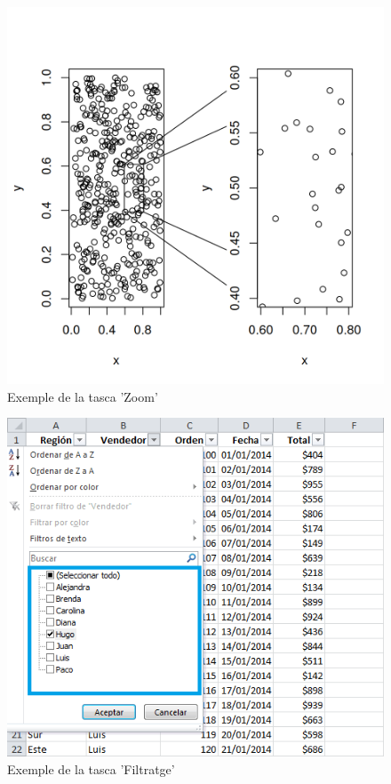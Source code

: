 \documentclass[a4paper,12pt]{report}
\begin{document}
\begin{figure}[H]
    \centering
    \includegraphics[scale = 0.8]{images/zoom.png}
    \caption{Exemple de la tasca 'Zoom'}
    \label{fig:zoom}
\end{figure}
\begin{figure}
    \centering
    \includegraphics[scale = 0.7]{images/filtro.png}
    \caption{Exemple de la tasca 'Filtratge'}
    \label{fig:filtratge}
\end{figure}
\end{document}

